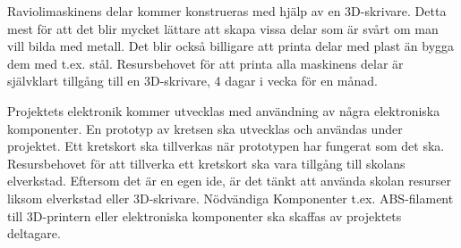 Raviolimaskinens delar kommer konstrueras med hjälp av en 3D-skrivare. Detta mest för att det blir mycket lättare att skapa vissa delar som är svårt om man vill bilda med metall. Det blir också billigare att printa delar med plast än bygga dem med t.ex. stål. Resursbehovet för att printa alla maskinens delar är självklart tillgång till en 3D-skrivare, 4 dagar i vecka för en månad.

Projektets elektronik kommer utvecklas med användning av några elektroniska komponenter. En prototyp av kretsen ska utvecklas och användas under projektet. Ett kretskort ska tillverkas när prototypen har fungerat som det ska. Resursbehovet för att tillverka ett kretskort ska vara tillgång till skolans elverkstad. 
Eftersom det är en egen ide, är det tänkt att använda skolan resurser liksom elverkstad eller 3D-skrivare. Nödvändiga Komponenter t.ex. ABS-filament till 3D-printern eller elektroniska komponenter ska skaffas av projektets deltagare.